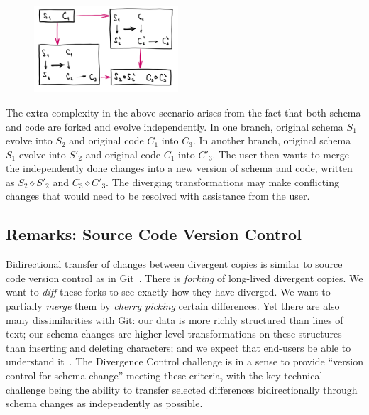 \documentclass[english,crc]{programming}
\DeclareRobustCommand{\frameworkbox}[1]{\leftbar#1\endleftbar}
\newcommand{\frameworkboxtitle}[1]{\noindent{\firamedium #1.}\quad}
\begin{document}
\frameworkbox{
\begin{figure}
\vspace{-0.5em}
\includegraphics[width=14.5em]{figures/arr-divergence.png}
\vspace{-1.5em}
\end{figure}
\frameworkboxtitle{Maintaining Divergent Variants}
The extra complexity in the above scenario arises from the fact that both schema and
code are forked and evolve independently. In one branch, original schema $S_1$ evolve
into $S_2$ and original code $C_1$ into $C_3$. In another branch, original schema $S_1$
evolve into $S'_2$ and original code $C_1$ into $C'_3$. The user then wants to merge
the independently done changes into a new version of schema and code, written as
$S_2 \diamond S'_2$ and $C_3 \diamond C'_3$. The diverging transformations may make
conflicting changes that would need to be resolved with assistance from the user.}


\subsection*{Remarks: Source Code Version Control}

Bidirectional transfer of changes between divergent copies is similar to source code version
control as in Git~\cite{ProGit}. There is \textit{forking} of long-lived divergent copies.
We want to \textit{diff} these forks to see exactly how they have diverged. We want to
partially \textit{merge} them by \textit{cherry picking} certain differences. Yet there are
also many dissimilarities with Git: our data is more richly structured than lines of text; our
schema changes are higher-level transformations on these structures than inserting and
deleting characters; and we expect that end-users be able to understand it~\cite{gitless}.
The Divergence Control challenge is in a sense to provide ``version control for schema
change'' meeting these criteria, with the key technical challenge being the ability to
transfer selected differences bidirectionally through schema changes as independently as possible.
\end{document}
